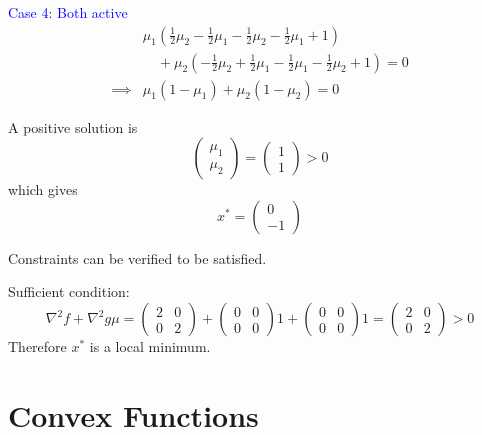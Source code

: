 \documentclass{article}
\begin{document}
	 \vfill

	\textcolor{blue}{Case 4: Both active}
	\begin{align*}
		& \mu_1(\frac{1}{2}\mu_2 - \frac{1}{2}\mu_1 - \frac{1}{2}\mu_2-\frac{1}{2}\mu_1 + 1) \\
		& \quad 
		+ \mu_2(-\frac{1}{2}\mu_2 + \frac{1}{2}\mu_1 - \frac{1}{2}\mu_1 - \frac{1}{2}\mu_2 + 1) = 0 \\
		\implies & \mu_1(1-\mu_1) + \mu_2(1-\mu_2) = 0
	\end{align*}	

	A positive solution is
	\[ 
		\begin{pmatrix}
	    	\mu_1\\
	    	\mu_2
	  	\end{pmatrix} = 
	  	\begin{pmatrix}
	    	1\\1
	  	\end{pmatrix} > 0 
	\]
	which gives
	\[
		x^{\ast} = 
			\begin{pmatrix}
	      		0 \\ -1
	    	\end{pmatrix}
	\]
	
	
	Constraints can be verified to be satisfied.
	
	
	
	Sufficient condition:
	\[ 
		\nabla^2 f + \nabla^2 g \mu = 
			\begin{pmatrix}
	    		2 & 0\\
	    		0 & 2
	  		\end{pmatrix} + 
	  		\begin{pmatrix}
	    		0 & 0\\
	    		0 & 0
	  		\end{pmatrix}1 + 
	  		\begin{pmatrix}
	    		0 & 0\\
	    		0 & 0
	  		\end{pmatrix}1 = 
	  		\begin{pmatrix}
	    		2 & 0\\
	    		0 & 2
	  		\end{pmatrix} > 0
	\]
	Therefore $x^{\ast}$ is a local minimum.	

\section{Convex Functions}
\end{document}
